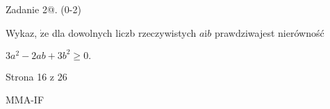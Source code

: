 \documentclass[a4paper,12pt]{article}
\begin{document}
Zadanie 2@. (0-2)

Wykaz, $\dot{\mathrm{z}}\mathrm{e}$ dla dowolnych liczb rzeczywistych $a\mathrm{i}b$ prawdziwajest nierówność

$3a^{2}-2ab+3b^{2}\geq 0.$

Strona 16 z 26

MMA-IF
\end{document}
